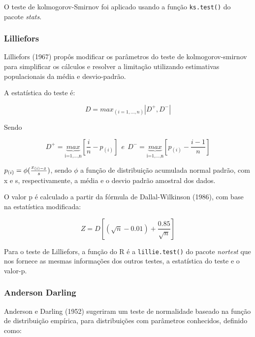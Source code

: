 \documentclass[a4paper,11pt]{article} %
\begin{document}
O teste de kolmogorov-Smirnov foi aplicado usando a função \texttt{ks.test()} do pacote \textit{stats}. \vskip0.3cm

\subsubsection{Lilliefors}

Lilliefors (1967) propôs modificar os parâmetros do teste de kolmogorov-smirnov para simplificar os cálculos e resolver a limitação utilizando estimativas populacionais da média e desvio-padrão.\vskip0.3cm

A estatística do teste é:

\begin{equation}
   D = max_{(i=1,...,n)}|D^{+},D^{-}|
\end{equation}

Sendo

\begin{equation}
    D^{+} =   \underbrace{max}_{\mbox{i=1,...,n}}    {\left[\frac{i}{n} - p_{(i)}\right]} \ \ e \ \ D^{-} = \underbrace{max}_{\mbox{i=1,...,n}}  {\left[p_{(i)} - \frac{i-1}{n}\right]}
\end{equation}

$ p_{(i)}= \phi( \frac{x_{(i)-\Bar{x}}}{s} )$, sendo $\phi$ a função de distribuição acumulada normal padrão, com x e s, respectivamente, a média e o desvio padrão amostral dos dados.\vskip0.3cm


O valor p é calculado a partir da fórmula de Dallal-Wilkinson (1986), com base na estatística modificada:

\begin{equation}
    Z = D \left[(\sqrt{n} - 0.01) + \frac{0.85}{\sqrt{n}} \right]
\end{equation}


\vskip0.3cm


Para o teste de Lilliefors, a função do R é a \texttt{lillie.test()} do pacote \textit{nortest} que nos fornece as mesmas informações dos outros testes, a estatística do teste e o valor-p.\vskip0.3cm






\subsubsection{Anderson Darling}

Anderson e Darling (1952) sugeriram um teste de normalidade baseado na função de distribuição empírica, para distribuições com parâmetros conhecidos, definido como: 
\end{document}

